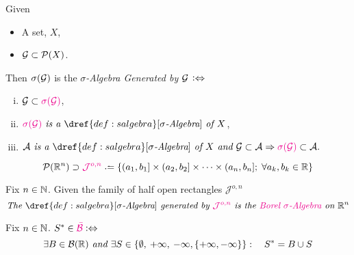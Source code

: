 \begin{definition}
Given 
\begin{itemize}
\item
	A set, $X$,
\item
	$\mathcal{G} \subset \mathcal{P}(X)$.
\end{itemize}
Then {\color{Magenta}$\sigma(\mathcal{G})$} is the {\color{Magenta}\emph{$\sigma$-Algebra Generated by $\mathcal{G}$}} $\mathrel{\vcentcolon\Leftrightarrow}$
\begin{enumerate}[(i)]
\centering
\item
	$\G \subset {\color{Magenta}\sigma(\G)}$,
\item
	${\color{Magenta}\sigma(\G)} \text{\it\ is a } \dref{def:salgebra}[\sigma\text{\it -Algebra}] \text{\it\ of }X$,
\item
	$\A \text{\it\ is a }\dref{def:salgebra}[\sigma\text{\it -Algebra}] \text{\it\ of } X \text{\it\ and } \G \subset \A  \Rightarrow {\color{Magenta}\sigma(\G)} \subset \A.$
\end{enumerate}
\end{definition}

\begin{definition}\label{def:rect}
$$\P(\R^n) \supset {\color{Magenta}\J} \defeq \{(a_1, b_1] \times (a_2, b_2] \times \dots \times (a_n, b_n]; \; \forall a_k, b_k \in \R\}$$
\end{definition}

\begin{definition}\label{def:balgebra}
Fix $n \in \mathbb{N}$. Given the family of half open rectangles $\mathcal{J}^{o,n}$
$$ \text{\it The } \dref{def:salgebra}[\sigma\text{\it -Algebra}] \text{\it\ generated by } {\color{Magenta}\mathcal{J}^{o,n}}\text{\it\ is the } \text{\color{Magenta}\it Borel $\sigma$-Algebra} \text{\it\ on }\R^n$$
\end{definition}

\begin{definition}
Fix $n \in \mathbb{N}$. $S^* \in {\color{Magenta}\eB} \logeq$
$$\exists B \in \mathcal{B}(\mathbb{R}) \text{\it\ and }\exists S \in \{\emptyset,\> +\infty,\> -\infty, \{+\infty, -\infty\}\}: \quad S^* = B \cup S$$
\end{definition}

